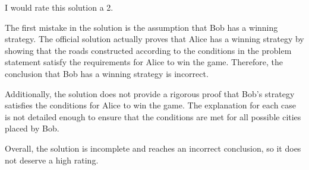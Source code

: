 I would rate this solution a 2.

The first mistake in the solution is the assumption that Bob has a winning strategy. The official solution actually proves that Alice has a winning strategy by showing that the roads constructed according to the conditions in the problem statement satisfy the requirements for Alice to win the game. Therefore, the conclusion that Bob has a winning strategy is incorrect.

Additionally, the solution does not provide a rigorous proof that Bob's strategy satisfies the conditions for Alice to win the game. The explanation for each case is not detailed enough to ensure that the conditions are met for all possible cities placed by Bob.

Overall, the solution is incomplete and reaches an incorrect conclusion, so it does not deserve a high rating.
